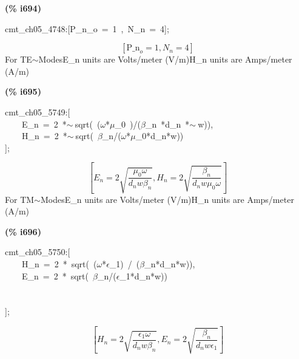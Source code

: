 \documentclass[fleqn]{article}
\begin{document}
\noindent
\begin{minipage}[t]{4.000000em}\color{red}\bfseries
(\% i694)	
\end{minipage}
\begin{minipage}[t]{\textwidth}\color{blue}
cmt\_ch05\_4748:[P\_n\_o\ =\ 1\ ,\ N\_n\ =\ 4];
\end{minipage}
\[\displaystyle \tag{\% o694} 
\left[ {{\ensuremath{\mathrm{P\_ n}}}_o}=1\operatorname{,}{N_n}=4\right] \mbox{}
\]
For TE\ensuremath{\sim }ModesE\_n units are Volts/meter (V/m)H\_n units are Amps/meter (A/m)


\noindent
\begin{minipage}[t]{4.000000em}\color{red}\bfseries
(\% i695)	
\end{minipage}
\begin{minipage}[t]{\textwidth}\color{blue}
cmt\_ch05\_5749:[\\
\ \ \ \ E\_n\ =\ 2\ *\ensuremath{\sim\ }sqrt(\ (\ensuremath{\omega}*\ensuremath{\mu}\_0\ )/(\ensuremath{\beta}\_n\ *d\_n\ *\ensuremath{\sim\ }w)),\\
\ \ \ \ H\_n\ =\ 2\ *\ensuremath{\sim\ }sqrt(\ \ensuremath{\beta}\_n/(\ensuremath{\omega}*\ensuremath{\mu}\_0*d\_n*w))\\
];
\end{minipage}
\[\displaystyle \tag{\% o695} 
\left[ {E_n}=2 \sqrt{\frac{{{\mu }_0} \omega }{{d_n} w {{\beta }_n}}}\operatorname{,}{H_n}=2 \sqrt{\frac{{{\beta }_n}}{{d_n} w {{\mu }_0} \omega }}\right] \mbox{}
\]
For TM\ensuremath{\sim }ModesE\_n units are Volts/meter (V/m)H\_n units are Amps/meter (A/m)


\noindent
\begin{minipage}[t]{4.000000em}\color{red}\bfseries
(\% i696)	
\end{minipage}
\begin{minipage}[t]{\textwidth}\color{blue}
cmt\_ch05\_5750:[\\
\ \ \ \ H\_n\ =\ 2\ *\ sqrt(\ (\ensuremath{\omega}*\ensuremath{\epsilon}\_1)\ /\ (\ensuremath{\beta}\_n*d\_n*w)),\\
\ \ \ \ E\_n\ =\ 2\ *\ sqrt(\ \ensuremath{\beta}\_n/(\ensuremath{\epsilon}\_1*d\_n*w))\\
\\
\\
];
\end{minipage}
\[\displaystyle \tag{\% o696} 
\left[ {H_n}=2 \sqrt{\frac{{{\epsilon }_1} \omega }{{d_n} w {{\beta }_n}}}\operatorname{,}{E_n}=2 \sqrt{\frac{{{\beta }_n}}{{d_n} w {{\epsilon }_1}}}\right] \mbox{}
\]
\end{document}
